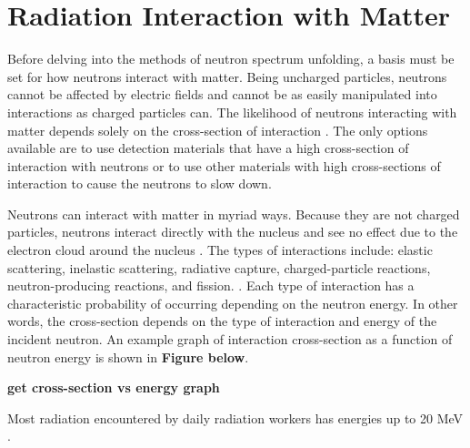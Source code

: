 \section{Radiation Interaction with Matter}\label{radiation_basics}
Before delving into the methods of neutron spectrum unfolding, a basis must be set for how neutrons interact with matter. Being uncharged particles, neutrons cannot be affected by electric fields and cannot be as easily manipulated into interactions as charged particles can. The likelihood of neutrons interacting with matter depends solely on the cross-section of interaction \cite{lamarsh_baratta_2018}. The only options available are to use detection materials that have a high cross-section of interaction with neutrons or to use other materials with high cross-sections of interaction to cause the neutrons to slow down.

Neutrons can interact with matter in myriad ways. Because they are not charged particles, neutrons interact directly with the nucleus and see no effect due to the electron cloud around the nucleus \cite{lamarsh_baratta_2018}. The types of interactions include: elastic scattering, inelastic scattering, radiative capture, charged-particle reactions, neutron-producing reactions, and fission. \cite{lamarsh_baratta_2018}. Each type of interaction has a characteristic probability of occurring depending on the neutron energy. In other words, the cross-section depends on the type of interaction and energy of the incident neutron. An example graph of interaction cross-section as a function of neutron energy is shown in \textbf{Figure below}.

\textbf{get cross-section vs energy graph}

Most radiation encountered by daily radiation workers has energies up to 20 MeV \cite{lamarsh_baratta_2018}.